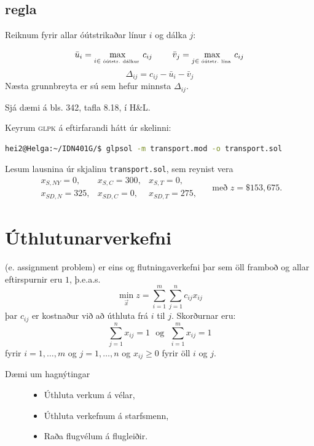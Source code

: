 \subsection{ regla}
Reiknum fyrir allar óútstrikaðar línur $i$ og dálka $j$:

$$\bar{u}_i = \max_{i\in \tiny{\mbox{ óútstr. dálkur }}}c_{ij} ~~~~~~~ \bar{v}_j = \max_{j\in \tiny{\mbox{ óútstr. lína }}}c_{ij}$$
$$\Delta_{ij}=c_{ij}-\bar{u}_i-\bar{v}_j$$
Næsta grunnbreyta er sú sem hefur minnsta $\Delta_{ij}$.

\begin{aths}Sjá dæmi á bls. 342, tafla 8.18, í H\&L. \end{aths}

\begin{daemi}\hspace{.1cm}
 
\end{daemi}
Keyrum \textsc{glpk} á eftirfarandi hátt úr skelinni:
\begin{lstlisting}[language=bash]
hei2@Helga:~/IDN401G/$ glpsol -m transport.mod -o transport.sol
\end{lstlisting}
Lesum lausnina úr skjalinu \texttt{transport.sol}, sem reynist vera 
$$\begin{array}{lll}x_{S,NY}=0, & x_{S,C}=300,& x_{S,T}=0,\\ x_{SD,N}=325,& x_{SD,C}=0,& x_{SD,T}=275,\end{array}\quad\mbox{ með } z=\$ 153,675.$$


\section{Úthlutunarverkefni}
 (e. assignment problem) er eins og flutningaverkefni þar sem öll framboð og allar
eftirspurnir eru $1$, þ.e.a.s.
$$\min_{\vec{x}} z = \sum_{i=1}^m\sum_{j=1}^n c_{ij}x_{ij}$$
þar $c_{ij}$ er kostnaður við að úthluta frá $i$ til $j$. Skorðurnar eru:
$$\sum_{j=1}^n x_{ij} = 1 ~~~ \mbox{og} ~~~ \sum_{i=1}^m x_{ij} = 1$$
fyrir  $i=1,\ldots,m$ og $j=1,\ldots,n$ og $x_{ij}\ge 0$ fyrir öll $i$ og $j$.

\begin{description}
 \item[Dæmi um hagnýtingar]\hspace{.1cm}
\begin{itemize}
 \item Úthluta verkum á vélar,
 \item Úthluta verkefnum á starfsmenn,
 \item Raða flugvélum á flugleiðir.
\end{itemize}
\end{description}


